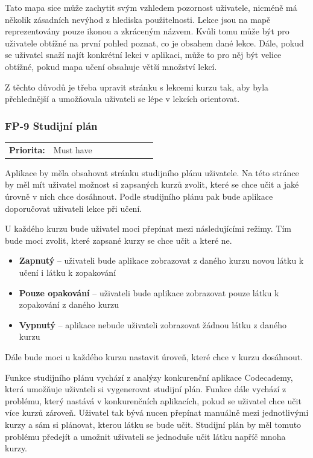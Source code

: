 Tato mapa sice může zachytit svým vzhledem pozornost uživatele, nicméně má několik zásadních nevýhod z hlediska použitelnosti. Lekce jsou na mapě reprezentovány pouze ikonou a zkráceným názvem. Kvůli tomu může být pro uživatele obtížné na první pohled poznat, co je obsahem dané lekce. Dále, pokud se uživatel snaží najít konkrétní lekci v aplikaci, může to pro něj být velice obtížné, pokud mapa učení obsahuje větší množství lekcí.

Z těchto důvodů je třeba upravit stránku s lekcemi kurzu tak, aby byla přehlednější a umožňovala uživateli se lépe v lekcích orientovat.

\subsubsection{FP-9 Studijní plán}

\begin{tabular}{lp{0.7\linewidth}}
    \textbf{Priorita:} & Must have \\
\end{tabular}

Aplikace by měla obsahovat stránku studijního plánu uživatele. Na této stránce by měl mít uživatel možnost si zapsaných kurzů zvolit, které se chce učit a jaké úrovně v nich chce dosáhnout. Podle studijního plánu pak bude aplikace doporučovat uživateli lekce při učení.

U každého kurzu bude uživatel moci přepínat mezi následujícími režimy. Tím bude moci zvolit, které zapsané kurzy se chce učit a které ne.

\begin{itemize}
    \item \textbf{Zapnutý} -- uživateli bude aplikace zobrazovat z daného kurzu novou látku k učení i látku k zopakování
    \item \textbf{Pouze opakování} -- uživateli bude aplikace zobrazovat pouze látku k zopakování z daného kurzu
    \item \textbf{Vypnutý} -- aplikace nebude uživateli zobrazovat žádnou látku z daného kurzu
\end{itemize}

Dále bude moci u každého kurzu nastavit úroveň, které chce v kurzu dosáhnout.

Funkce studijního plánu vychází z analýzy konkurenční aplikace Codecademy, která umožňuje uživateli si vygenerovat studijní plán. Funkce dále vychází z problému, který nastává v konkurenčních aplikacích, pokud se uživatel chce učit více kurzů zároveň. Uživatel tak bývá nucen přepínat manuálně mezi jednotlivými kurzy a sám si plánovat, kterou látku se bude učit. Studijní plán by měl tomuto problému předejít a umožnit uživateli se jednoduše učit látku napříč mnoha kurzy.

